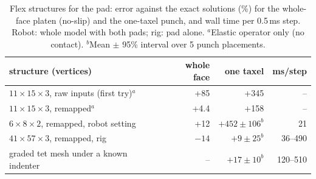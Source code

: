 \documentclass[10pt,twocolumn]{article}
\begin{document}
\begin{table}[t]\centering\footnotesize
\caption{Flex structures for the pad: error against the exact solutions (\%) for the whole-face platen (no-slip) and
the one-taxel punch, and wall time per 0.5\,ms step. Robot: whole model with both pads; rig: pad alone. ${}^a$Elastic
operator only (no contact). ${}^b$Mean $\pm$ 95\% interval over 5 punch placements.}
\label{tab:flex}\setlength{\tabcolsep}{2.5pt}
\begin{tabular}{@{}lrrr@{}}\toprule
structure (vertices) & whole face & one taxel & ms/step\\\midrule
$11\times15\times3$, raw inputs (first try)$^a$ & +85 & +345 & --\\
$11\times15\times3$, remapped$^a$ & +4.4 & +158 & --\\
$6\times8\times2$, remapped, robot setting & +12 & $+452\pm106^b$ & 21\\
$41\times57\times3$, remapped, rig & $-14$ & $+9\pm25^b$ & 36--490\\
graded tet mesh under a known indenter & -- & $+17\pm10^b$ & 120--510\\\bottomrule
\end{tabular}
\end{table}
\end{document}
